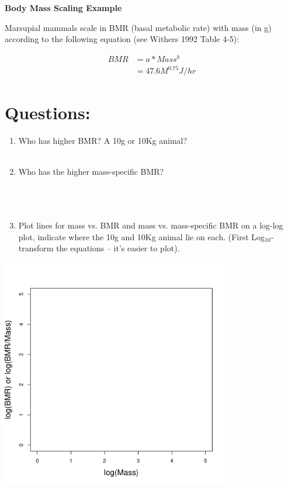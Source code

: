 \documentclass[12pt, letterpaper]{article}
\begin{document}
\begin{center}\textbf{\Large Body Mass Scaling Example} \end{center}
\bigskip


Marsupial mammals scale in BMR (basal metabolic rate) with mass (in g) according to the following equation (see Withers 1992 Table 4-5):

\begin{align*}
BMR &= a * Mass^b \\
	&= 47.6M^{0.75} J/hr 
\end{align*}	


\section*{Questions:}
\begin{enumerate}
\item Who has higher BMR? A 10g or 10Kg animal?  \\ \\
\item Who has the higher mass-specific BMR?  \\ \\ \\ \\
\item Plot lines for mass vs. BMR and mass vs. mass-specific BMR on a log-log plot, indicate where the 10g and 10Kg animal lie on each. (First Log$_{10}$-transform the equations -- it's easier to plot). \\ 
\end{enumerate}

\begin{right}
  \includegraphics[width=100mm]{blankplot}
\end{right}
\end{document}
